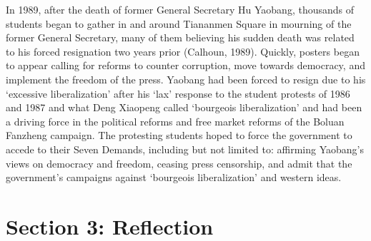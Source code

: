 \documentclass[letterpaper, 12pt]{article}
\begin{document}
In 1989, after the death of former General Secretary Hu Yaobang, thousands of students began to gather in and around Tiananmen Square in mourning of the former General Secretary, many of them believing his sudden death was related to his forced resignation two years prior (Calhoun, 1989). Quickly, posters began to appear calling for reforms to counter corruption, move towards democracy, and implement the freedom of the press. Yaobang had been forced to resign due to his ‘excessive liberalization’ after his ‘lax’ response to the student protests of 1986 and 1987 and what Deng Xiaopeng called ‘bourgeois liberalization’ and had been a driving force in the political reforms and free market reforms of the Boluan Fanzheng campaign. The protesting students hoped to force the government to accede to their Seven Demands, including but not limited to: affirming Yaobang’s views on democracy and freedom, ceasing press censorship, and admit that the government’s campaigns against ‘bourgeois liberalization’ and western ideas.

\section{Section 3: Reflection}
\end{document}
